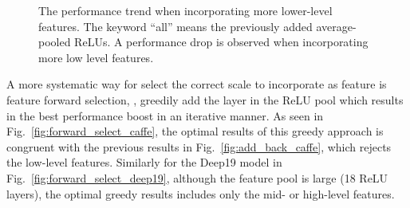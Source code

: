 \documentclass[10pt,twocolumn,letterpaper]{article}
\begin{document}

\begin{figure}[htbp]
\centering
\caption{The performance trend when incorporating more lower-level features. The keyword ``all'' means the previously added average-pooled ReLUs. A performance drop is observed when incorporating more low level features.}

\label{fig:add_back}
\end{figure}

A more systematic way for select the correct scale to incorporate as feature is feature forward selection, \ie, greedily add the layer in the ReLU pool which results in the best performance boost in an iterative manner. As seen in Fig.~\ref{fig:forward_select_caffe}, the optimal results of this greedy approach is congruent with the previous results in Fig.~\ref{fig:add_back_caffe}, which rejects the low-level features. Similarly for the Deep19 model in Fig.~\ref{fig:forward_select_deep19}, although the feature pool is large (18 ReLU layers), the optimal greedy results includes only the mid- or high-level features. 
\end{document}
